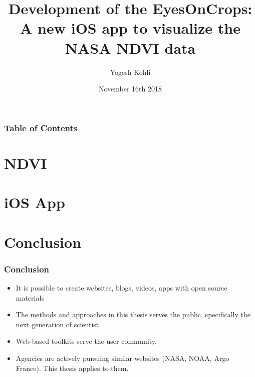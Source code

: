 \documentclass[hyperref={bookmarks=false},aspectratio=169]{beamer}
\title[NASA NDVI data visualization and delivery]
{\bfseries{Development of the EyesOnCrops: A new iOS app to visualize the NASA NDVI data}}
\author{Yogesh Kohli}
\institute{San Diego State University}
\date{November 16th 2018}
\begin{document}
\titlepage  %

\begin{frame}
\frametitle{Table of Contents}
\tableofcontents
\end{frame}



\section{NDVI}


\section{iOS App}


\section{Conclusion}

\begin{frame}
\frametitle{Conclusion}
\begin{itemize}
    \item It is possible to create websites, blogs, videos, apps with open source materials
    \item The methods and approaches in this thesis serves the public, specifically the next generation of scientist
    \item Web-based toolkits serve the user community.
    \item Agencies are actively pursuing similar websites (NASA, NOAA, Argo France). This thesis applies to them.
    
\end{itemize}
\end{frame}
\end{document}
